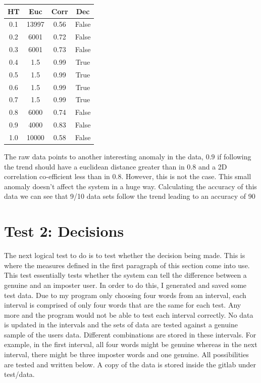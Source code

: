 \documentclass[10pt,a4paper]{report}
\begin{document}
\begin{center}
	\begin{tabular}{|c|c|c|c|}
	\hline
	HT & Euc & Corr & Dec \\ [0.5ex]
	\hline
	\hline
	0.1 & 13997 & 0.56 & False \\
	0.2 & 6001 & 0.72 & False \\
	0.3 & 6001 & 0.73 & False \\
	0.4 & 1.5 & 0.99 & True \\
	0.5 & 1.5 & 0.99 & True \\
	0.6 & 1.5 & 0.99 & True \\
	0.7 & 1.5 & 0.99 & True \\
	0.8 & 6000 & 0.74 & False \\
	0.9 & 4000 & 0.83 & False \\
	1.0 & 10000 & 0.58 & False \\
	\hline
	\end{tabular}
\end{center}

The raw data points to another interesting anomaly in the data, \(0.9\) if following the trend should have a euclidean distance greater than in \(0.8\) and a 2D correlation co-efficient less than in \(0.8\). However, this is not the case. This small anomaly doesn't affect the system in a huge way. Calculating the accuracy of this data we can see that 9/10 data sets follow the trend leading to an accuracy of 90%

\section{Test 2: Decisions}

The next logical test to do is to test whether the decision being made. This is where the measures defined in the first paragraph of this section come into use. This test essentially tests whether the system can tell the difference between a genuine and an imposter user. In order to do this, I generated and saved some test data. Due to my program only choosing four words from an interval, each interval is comprised of only four words that are the same for each test. Any more and the program would not be able to test each interval correctly. No data is updated in the intervals and the sets of data are tested against a genuine sample of the users data. Different combinations are stored in these intervals. For example, in the first interval, all four words might be genuine whereas in the next interval, there might be three imposter words and one genuine. All possibilities are tested and written below. A copy of the data is stored inside the gitlab under test/data.
\end{document}
